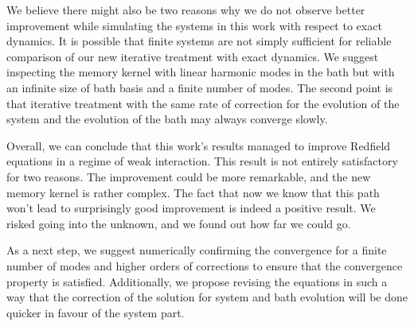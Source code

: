 We believe there might also be two reasons why we do not observe better improvement while simulating the systems in this work with respect to exact dynamics. It is possible that finite systems are not simply sufficient for reliable comparison of our new iterative treatment with exact dynamics. We suggest inspecting the memory kernel with linear harmonic modes in the bath but with an infinite size of bath basis and a finite number of modes. The second point is that iterative treatment with the same rate of correction for the evolution of the system and the evolution of the bath may always converge slowly. 

Overall, we can conclude that this work's results managed to improve Redfield equations in a regime of weak interaction. This result is not entirely satisfactory for two reasons. The improvement could be more remarkable, and the new memory kernel is rather complex. The fact that now we know that this path won't lead to surprisingly good improvement is indeed a positive result. We risked going into the unknown, and we found out how far we could go. 

As a next step, we suggest numerically confirming the convergence for a finite number of modes and higher orders of corrections to ensure that the convergence property is satisfied. Additionally, we propose revising the equations in such a way that the correction of the solution for system and bath evolution will be done quicker in favour of the system part. 
